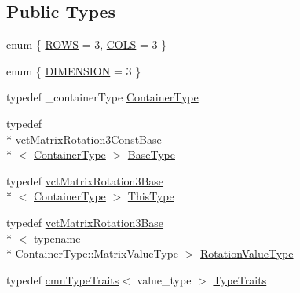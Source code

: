 \subsection*{Public Types}
\begin{DoxyCompactItemize}
\item 
enum \{ \hyperlink{classvct_matrix_rotation3_base_abdf4d3751b8966af4ef69c15998d4115a262124a9ac112fef9aa619bd72e5c5f5}{R\-O\-W\-S} = 3, 
\hyperlink{classvct_matrix_rotation3_base_abdf4d3751b8966af4ef69c15998d4115a55a02c6e4641f16f1c7ca8ba88e47d79}{C\-O\-L\-S} = 3
 \}
\item 
enum \{ \hyperlink{classvct_matrix_rotation3_base_a97514c086bdd3a691714817775b02f21a43f9b5ba9769ee62eadd8398853504cd}{D\-I\-M\-E\-N\-S\-I\-O\-N} = 3
 \}
\item 
typedef \-\_\-container\-Type \hyperlink{classvct_matrix_rotation3_base_ac6181bbfdbc84777f613a0bc5a6bc75a}{Container\-Type}
\item 
typedef \\*
\hyperlink{classvct_matrix_rotation3_const_base}{vct\-Matrix\-Rotation3\-Const\-Base}\\*
$<$ \hyperlink{classvct_matrix_rotation3_base_ac6181bbfdbc84777f613a0bc5a6bc75a}{Container\-Type} $>$ \hyperlink{classvct_matrix_rotation3_base_a81e215f535ce137435cbafdcb0f3b6f1}{Base\-Type}
\item 
typedef \hyperlink{classvct_matrix_rotation3_base}{vct\-Matrix\-Rotation3\-Base}\\*
$<$ \hyperlink{classvct_matrix_rotation3_base_ac6181bbfdbc84777f613a0bc5a6bc75a}{Container\-Type} $>$ \hyperlink{classvct_matrix_rotation3_base_a027be766cb10ca3c2ad8e85c28ed0af9}{This\-Type}
\item 
typedef \hyperlink{classvct_matrix_rotation3_base}{vct\-Matrix\-Rotation3\-Base}\\*
$<$ typename \\*
Container\-Type\-::\-Matrix\-Value\-Type $>$ \hyperlink{classvct_matrix_rotation3_base_a9cac9a0141e6b59fe9185b1121f70229}{Rotation\-Value\-Type}
\item 
typedef \hyperlink{classcmn_type_traits}{cmn\-Type\-Traits}$<$ value\-\_\-type $>$ \hyperlink{classvct_matrix_rotation3_base_aa759c028d73ab710d2e116ca08252719}{Type\-Traits}
\end{DoxyCompactItemize}
